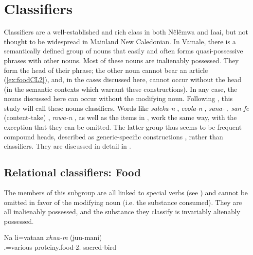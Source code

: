 \section{Classifiers}
 \label{sec:CL}
Classifiers are a well-established and rich class in both Nêlêmwa \parencite{bril_nelemwa_2002} and Iaai, but not thought to be widespread in Mainland New Caledonian. In Vamale, there is a semantically defined group of nouns that easily and often forms quasi-possessive phrases with other nouns. Most of these nouns are inalienably possessed. They form the head of their phrase; the other noun cannot bear an article (\ref{ex:foodCL2}), and, in the cases discussed here, cannot occur without the head (in the semantic contexts which warrant these constructions). In any case, the nouns discussed here can occur without the modifying noun. Following \textcite{aikhenvald_classifiers_2000}, this study will call these nouns classifiers. Words like \textit{saleka-n} , \textit{coola-n} , \textit{sana-} , \textit{san-fe} (content-take) , \textit{mwa-n} , as well as the items in , work the same way, with the exception that they can be omitted. The latter group thus seems to be frequent compound heads, described as generic-specific constructions \parencite[86]{aikhenvald_classifiers_2000}, rather than classifiers. They are discussed in detail in .

 
 \subsection{Relational classifiers: Food}
 \label{ssec:food_CL}
 The members of this subgroup are all linked to special verbs (see ) and cannot be omitted in favor of the modifying noun (i.e. the substance consumed). They are all inalienably possessed, and the substance they classify is invariably alienably possessed. 
 

 \ea\label{ex:foodCL1} 
 \gll Na li=vataan \textit{xhua-m} (juu-mani)\\
   .=various proteiny.food-2. sacred-bird\\
 \glt {}
 \z 
 
